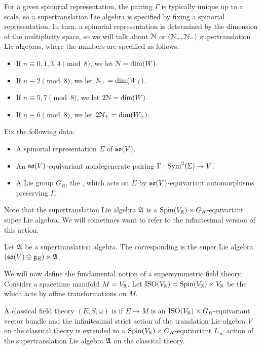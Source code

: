 \documentclass[10pt, oneside]{article}
\begin{document}
For a given spinorial representation, the pairing $\Gamma$ is typically unique up to a scale, so a supertranslation Lie algebra is specified by fixing a spinorial representation. In turn, a spinorial representation is determined by the dimension of the multiplicity space, so we will talk about $\mathcal{N}$ or $(\mathcal{N}_+, \mathcal{N}_-)$ supertranslation Lie algebras, where the numbers are specified as follows.
\begin{itemize}
\item If $n\equiv 0, 1, 3, 4\pmod 8$, we let $\mathcal{N} = \dim(W)$.

\item If $n\equiv 2 \pmod 8$, we let $\mathcal{N}_{\pm}=\dim(W_{\pm})$.

\item If $n\equiv 5, 7\pmod 8$, we let $2\mathcal{N} = \dim(W)$.

\item If $n\equiv 6\pmod 8$, we let $2\mathcal{N}_{\pm} = \dim(W_{\pm})$.
\end{itemize}

Fix the following data:
\begin{itemize}
\item A spinorial representation $\Sigma$ of $\mathfrak{so}(V)$.

\item An $\mathfrak{so}(V)$-equivariant nondegenerate pairing $\Gamma\colon \operatorname{Sym}^2(\Sigma)\rightarrow V$.

\item A Lie group $G_R$, the , which acts on $\Sigma$ by $\mathfrak{so}(V)$-equivariant automorphisms preserving $\Gamma$.
\end{itemize}

Note that the supertranslation Lie algebra $\mathfrak A$ is a $\mathrm{Spin}(V_\mathbb R)\times G_R$-equivariant super Lie algebra.  We will sometimes want to refer to the infinitesimal version of this action.
\begin{definition}
Let $\mathfrak A$ be a supertranslation algebra.  The corresponding  is the super Lie algebra $(\mathfrak{so}(V) \oplus \mathfrak{g}_R) \ltimes \mathfrak A$.
\end{definition}

We will now define the fundamental notion of a supersymmetric field theory.  Consider a spacetime manifold $M=V_\mathbb R$. Let $\mathrm{ISO}(V_\mathbb R) = \mathrm{Spin}(V_\mathbb R)\ltimes V_\mathbb R$ be the  which acts by affine transformations on $M$.

\begin{definition}
\label{dfn: super}
A classical field theory $(E, S, \omega)$ is  if $E\rightarrow M$ is an $\mathrm{ISO}(V_\mathbb R)\times G_R$-equivariant vector bundle and the infinitesimal strict action of the translation Lie algebra $V$ on the classical theory is extended to a $\mathrm{Spin}(V_\mathbb R)\times G_R$-equivariant $L_\infty$ action of the supertranslation Lie algebra $\mathfrak A$ on the classical theory.
\end{definition}
\end{document}
